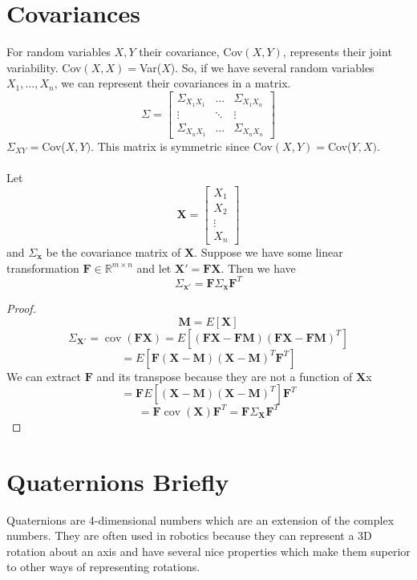 \documentclass[11pt]{article}
\newcommand{\R}{\mathbb{R}}
\renewcommand{\vec}[1]{\mathbf{#1}}
\newcommand{\mat}[1]{\mathbf{#1}}
\begin{document}
\section{Covariances}
For random variables $X,Y$ their covariance, Cov$(X,Y)$, represents their joint variability. Cov$(X,X) = $Var($X$). So, if we have several random variables $X_1, \dots, X_n$, we can represent their covariances in a matrix.
$$\Sigma = \begin{bmatrix}
\Sigma_{X_1X_1}& \dots &\Sigma_{X_1X_n}\\
\vdots &\ddots &\vdots\\
\Sigma_{X_nX_1} & \dots & \Sigma_{X_nX_n}
\end{bmatrix}$$
$\Sigma_{XY} = $Cov($X,Y)$.
This matrix is symmetric since Cov$(X,Y) = $Cov($Y,X)$.\\\\
Let 
$$\vec{X} = \begin{bmatrix}
X_1\\ X_2 \\ \vdots \\ X_n
\end{bmatrix}$$ and $\Sigma_{\vec{x}}$ be the covariance matrix of $\vec{X}$. Suppose we have some linear transformation $\mat{F} \in \R^{m \times n}$ and let $\vec{X}' = \mat{F}\vec{X}$. Then we have $$\Sigma_{\vec{x}'} = \mat{F}\Sigma_{\vec{x}}\mat{F}^T$$
\begin{proof}
$$\vec{M} = E[\vec{X}]$$
$$\Sigma_{\vec{X}'}=\operatorname{cov}(\mat{F}\vec{X}) = E[(\mat{F}\vec{X} - \mat{F}\vec{M})(\mat{F}\vec{X} - \mat{F}\vec{M})^T]$$
$$= E[\mat{F}(\vec{X} - \vec{M})(\vec{X} - \vec{M})^T\mat{F}^T]$$
We can extract $\mat{F}$ and its transpose because they are not a function of $\vec{X}$x
$$=\mat{F}E[(\vec{X} - \vec{M})(\vec{X} - \vec{M})^T]\mat{F}^T$$
$$=\mat{F}\operatorname{cov}(\vec{X})\mat{F}^T = \mat{F}\Sigma_{\vec{X}}\mat{F}^T$$
\end{proof}

\section{Quaternions Briefly}
Quaternions are 4-dimensional numbers which are an extension of the complex numbers. They are often used in robotics because they can represent a 3D rotation about an axis and have several nice properties which make them superior to other ways of representing rotations.
\end{document}
